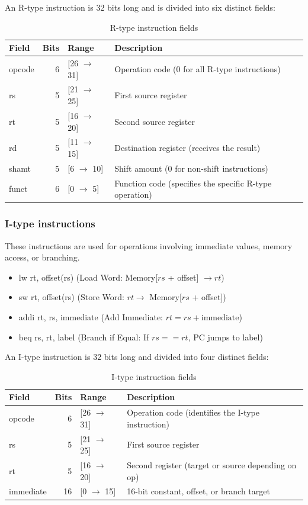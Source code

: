\documentclass[a4paper,11pt]{scrartcl}
\begin{document}
An R-type instruction is 32 bits long and is divided into six distinct fields:

\begin{table}[htbp]
\caption{\label{tab:R_type}R-type instruction fields}
\centering
\begin{tabular}{lrll}
\hline
\textbf{Field} & \textbf{Bits} & \textbf{Range} & \textbf{Description}\\
\hline
opcode & 6 & {[}26 \(\rightarrow\) 31] & Operation code (0 for all R-type instructions)\\
rs & 5 & {[}21 \(\rightarrow\) 25] & First source register\\
rt & 5 & {[}16 \(\rightarrow\) 20] & Second source register\\
rd & 5 & {[}11 \(\rightarrow\) 15] & Destination register (receives the result)\\
shamt & 5 & {[}6 \(\rightarrow\) 10] & Shift amount (0 for non-shift instructions)\\
funct & 6 & {[}0 \(\rightarrow\) 5] & Function code (specifies the specific R-type operation)\\
\hline
\end{tabular}
\end{table}
\subsubsection{I-type instructions}
\label{sec:org0425a11}

These instructions are used for operations involving immediate values, memory access, or branching.
\begin{itemize}
\item lw rt, offset(rs) (Load Word: Memory[\(rs\) + offset] \(\rightarrow rt\))
\item sw rt, offset(rs) (Store Word: \(rt \rightarrow\) Memory[\(rs\) + offset])
\item addi rt, rs, immediate (Add Immediate: \(rt = rs + \text{immediate}\))
\item beq rs, rt, label (Branch if Equal: If \(rs == rt\), PC jumps to label)
\end{itemize}

An I-type instruction is 32 bits long and divided into four distinct fields:

\begin{table}[htbp]
\caption{\label{tab:I_type}I-type instruction fields}
\centering
\begin{tabular}{lrll}
\hline
Field & Bits & Range & Description\\
\hline
opcode & 6 & {[}26 \(\rightarrow\) 31] & Operation code (identifies the I-type instruction)\\
rs & 5 & {[}21 \(\rightarrow\) 25] & First source register\\
rt & 5 & {[}16 \(\rightarrow\) 20] & Second register (target or source depending on op)\\
immediate & 16 & {[}0 \(\rightarrow\) 15] & 16-bit constant, offset, or branch target\\
\hline
\end{tabular}
\end{table}
\end{document}
